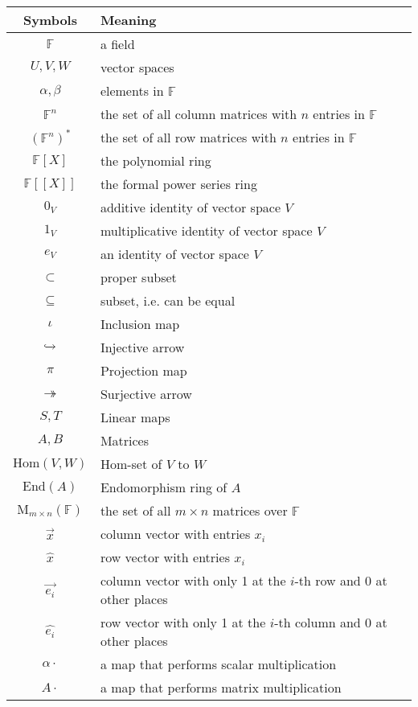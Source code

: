 \documentclass[
	11pt, %
	fleqn, %
	a4paper, %
]{LegrandOrangeBook}
\newcommand{\End}[1]{\text{End}(#1)} %
\newcommand{\Hom}[2]{\text{Hom}(#1, #2)} %
\newcommand{\F}{\mathbb{F}} %
\newcommand{\M}[2]{\text{M}_{#1}(#2)} %
\begin{document}
\noindent \begin{tabularx}{\textwidth}{cX}
    \toprule
    \textbf{Symbols} & \textbf{Meaning} \\
    \midrule
    $\F$ & a field \\
    $U, V, W$ & vector spaces \\
    $\alpha, \beta$ & elements in $\F$ \\
    $\F^n$ & the set of all column matrices with $n$ entries in $\F$ \\
    $(\F^n)^*$ & the set of all row matrices with $n$ entries in $\F$ \\
    $\F[X]$ & the polynomial ring \\
    $\F[[X]]$ & the formal power series ring \\
    \midrule
    $0_V$ & additive identity of vector space $V$ \\
    $1_V$ & multiplicative identity of vector space $V$ \\
    $e_V$ & an identity of vector space $V$ \\
    \midrule
    $\subset$ & proper subset \\
    $\subseteq$ & subset, i.e. can be equal \\
    \midrule
    $\iota$ & Inclusion map \\
    $\xhookrightarrow{}$ & Injective arrow \\
    $\pi$ & Projection map \\
    $\twoheadrightarrow$ & Surjective arrow \\
    \midrule
    $S, T$ & Linear maps \\
    $A, B$ & Matrices \\
    \midrule
    $\Hom{V}{W}$ & Hom-set of $V$ to $W$ \\
    $\End{A}$ & Endomorphism ring of $A$ \\
    $\M{m \times n}{\F}$ & the set of all $m \times n$ matrices over $\F$ \\
    \midrule
    $\vec{x}$ & column vector with entries $x_i$ \\
    $\hat{x}$ & row vector with entries $x_i$ \\
    $\vec{e_i}$ & column vector with only 1 at the $i$-th row and 0 at other places \\
    $\hat{e_i}$ & row vector with only 1 at the $i$-th column and 0 at other places \\
    \midrule
    $\alpha \cdot$ & a map that performs scalar multiplication \\
    $A \cdot$ & a map that performs matrix multiplication \\
    \bottomrule
\end{tabularx}
\end{document}
